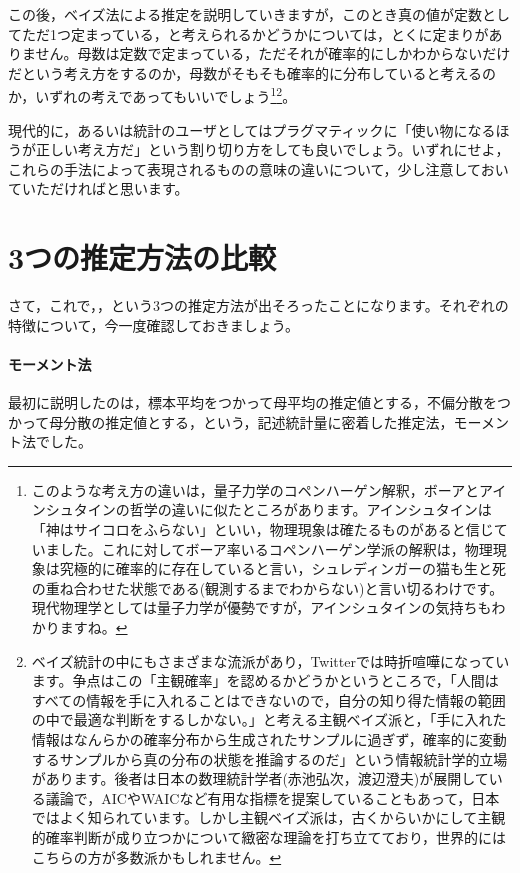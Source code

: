 \documentclass{ltjbook}
\begin{document}
この後，ベイズ法による推定を説明していきますが，このとき真の値が定数としてただ1つ定まっている，と考えられるかどうかについては，とくに定まりがありません。母数は定数で定まっている，ただそれが確率的にしかわからないだけだという考え方をするのか，母数がそもそも確率的に分布していると考えるのか，いずれの考えであってもいいでしょう\footnote{このような考え方の違いは，量子力学のコペンハーゲン解釈，ボーアとアインシュタインの哲学の違いに似たところがあります。アインシュタインは「神はサイコロをふらない」といい，物理現象は確たるものがあると信じていました。これに対してボーア率いるコペンハーゲン学派の解釈は，物理現象は究極的に確率的に存在していると言い，シュレディンガーの猫も生と死の重ね合わせた状態である(観測するまでわからない)と言い切るわけです。現代物理学としては量子力学が優勢ですが，アインシュタインの気持ちもわかりますね。}\footnote{ベイズ統計の中にもさまざまな流派があり，Twitterでは時折喧嘩になっています。争点はこの「主観確率」を認めるかどうかというところで，「人間はすべての情報を手に入れることはできないので，自分の知り得た情報の範囲の中で最適な判断をするしかない。」と考える主観ベイズ派と，「手に入れた情報はなんらかの確率分布から生成されたサンプルに過ぎず，確率的に変動するサンプルから真の分布の状態を推論するのだ」という情報統計学的立場があります。後者は日本の数理統計学者(赤池弘次，渡辺澄夫)が展開している議論で，AICやWAICなど有用な指標を提案していることもあって，日本ではよく知られています。しかし主観ベイズ派は，古くからいかにして主観的確率判断が成り立つかについて緻密な理論を打ち立てており，世界的にはこちらの方が多数派かもしれません。}。

現代的に，あるいは統計のユーザとしてはプラグマティックに「使い物になるほうが正しい考え方だ」という割り切り方をしても良いでしょう。いずれにせよ，これらの手法によって表現されるものの意味の違いについて，少し注意しておいていただければと思います。

\section{3つの推定方法の比較}

さて，これで，，という3つの推定方法が出そろったことになります。それぞれの特徴について，今一度確認しておきましょう。

\paragraph{モーメント法}
最初に説明したのは，標本平均をつかって母平均の推定値とする，不偏分散をつかって母分散の推定値とする，という，記述統計量に密着した推定法，モーメント法でした。
\end{document}
